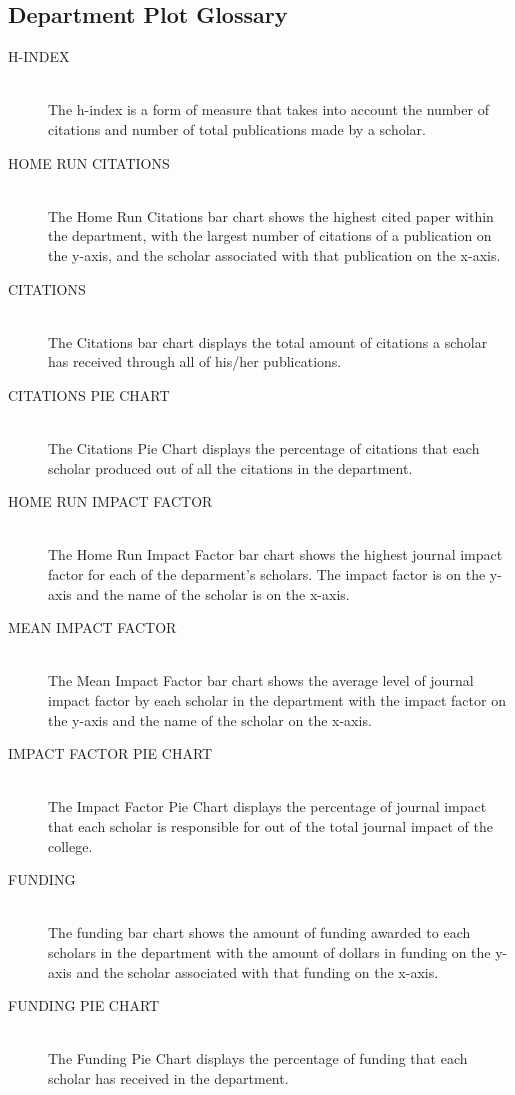 \subsection{Department Plot Glossary}

\begin{description}
  \item[H-INDEX] \hfill \\
  The h-index is a form of measure that takes into account the number of citations and number of total publications made by a scholar.
  \item[HOME RUN CITATIONS] \hfill \\
  The Home Run Citations bar chart shows the highest cited paper within the department, with the largest number of citations of a publication on the y-axis, and the scholar associated with that publication on the x-axis.
  \item[CITATIONS] \hfill \\
  The Citations bar chart displays the total amount of citations a scholar has received through all of his/her publications.
  \item[CITATIONS PIE CHART] \hfill \\
  The Citations Pie Chart displays the percentage of citations that each scholar produced out of all the citations in the department.
  \item[HOME RUN IMPACT FACTOR] \hfill \\
  The Home Run Impact Factor bar chart shows the highest journal impact factor for each of the deparment's scholars. The impact factor is on the y-axis and the name of the scholar is on the x-axis.
  \item[MEAN IMPACT FACTOR] \hfill \\
  The Mean Impact Factor bar chart shows the average level of journal impact factor by each scholar in the department with the impact factor on the y-axis and the name of the scholar on the x-axis.
  \item[IMPACT FACTOR PIE CHART] \hfill \\
  The Impact Factor Pie Chart displays the percentage of journal impact that each scholar is responsible for out of the total journal impact of the college.
  \item[FUNDING] \hfill \\
  The funding bar chart shows the amount of funding awarded to each scholars in the department with the amount of dollars in funding on the y-axis and the scholar associated with that funding on the x-axis.
  \item[FUNDING PIE CHART] \hfill \\
  The Funding Pie Chart displays the percentage of funding that each scholar has received in the department.
\end{description}




